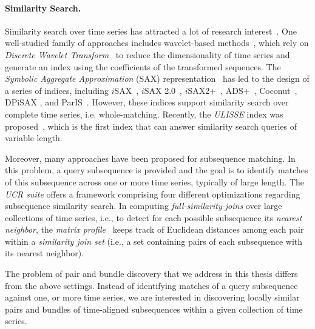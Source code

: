 \paragraph{Similarity Search.} Similarity search over time series has attracted a lot of research interest~\cite{DBLP:journals/pvldb/EchihabiZPB18}. One well-studied family of approaches includes wavelet-based methods~\cite{chan1999icde}, which rely on \emph{Discrete Wavelet Transform}~\cite{graps1995cse} to reduce the dimensionality of time series and generate an index using the coefficients of the transformed sequences. The \emph{Symbolic Aggregate Approximation} (SAX) representation~\cite{jessica2007dmkd} has led to the design of a series of indices, including $i$SAX~\cite{shieh2008kdd}, $i$SAX 2.0~\cite{camerra2010icdm}, $i$SAX2+~\cite{camerra2014kais}, ADS+~\cite{zoumpatianos2014sigmod}, Coconut~\cite{DBLP:journals/pvldb/KondylakisDZP18}, DPiSAX \cite{dpisaxjournal}, and ParIS~\cite{DBLP:conf/bigdataconf/PengFP18}. However, these indices support similarity search over complete time series, i.e. whole-matching. Recently, the \textit{ULISSE} index was proposed~\cite{linardi2018scalable}, which is the first index that can answer similarity search queries of variable length. 

Moreover, many approaches have been proposed for subsequence matching. In this problem, a query subsequence is provided and the goal is to identify matches of this subsequence across one or more time series, typically of large length. The \textit{UCR suite} \cite{rakthanmanon2012searching} offers a framework comprising four different optimizations regarding subsequence similarity search. In computing \textit{full-similarity-joins} over large collections of time series, i.e., to detect for each possible subsequence its \textit{nearest neighbor}, the \textit{matrix profile}~\cite{yeh2016matrix} keeps track of Euclidean distances among each pair within a \textit{similarity join set} (i.e., a set containing pairs of each subsequence with its nearest neighbor).

The problem of pair and bundle discovery that we address in this thesis differs from the above settings. Instead of identifying matches of a query subsequence against one, or more time series, we are interested in discovering locally similar pairs and bundles of time-aligned subsequences within a given collection of time series.

